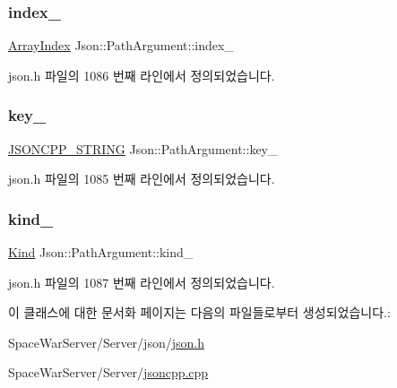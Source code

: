 \subsubsection{\texorpdfstring{index\+\_\+}{index\_}}
{\footnotesize\ttfamily \hyperlink{namespace_json_a8048e741f2177c3b5d9ede4a5b8c53c2}{Array\+Index} Json\+::\+Path\+Argument\+::index\+\_\+\hspace{0.3cm}{\ttfamily [private]}}



json.\+h 파일의 1086 번째 라인에서 정의되었습니다.

\mbox{\label{class_json_1_1_path_argument_af4024368548ff730ef2bed97d6f1ca43}} 
\subsubsection{\texorpdfstring{key\+\_\+}{key\_}}
{\footnotesize\ttfamily \hyperlink{json_8h_a1e723f95759de062585bc4a8fd3fa4be}{J\+S\+O\+N\+C\+P\+P\+\_\+\+S\+T\+R\+I\+NG} Json\+::\+Path\+Argument\+::key\+\_\+\hspace{0.3cm}{\ttfamily [private]}}



json.\+h 파일의 1085 번째 라인에서 정의되었습니다.

\mbox{\label{class_json_1_1_path_argument_ad4bc4b544b155a3d9c7788572ecf991b}} 
\subsubsection{\texorpdfstring{kind\+\_\+}{kind\_}}
{\footnotesize\ttfamily \hyperlink{class_json_1_1_path_argument_a2420bbad778573c147e578701b84d9b9}{Kind} Json\+::\+Path\+Argument\+::kind\+\_\+\hspace{0.3cm}{\ttfamily [private]}}



json.\+h 파일의 1087 번째 라인에서 정의되었습니다.



이 클래스에 대한 문서화 페이지는 다음의 파일들로부터 생성되었습니다.\+:\begin{DoxyCompactItemize}
\item 
Space\+War\+Server/\+Server/json/\hyperlink{json_8h}{json.\+h}\item 
Space\+War\+Server/\+Server/\hyperlink{jsoncpp_8cpp}{jsoncpp.\+cpp}\end{DoxyCompactItemize}

